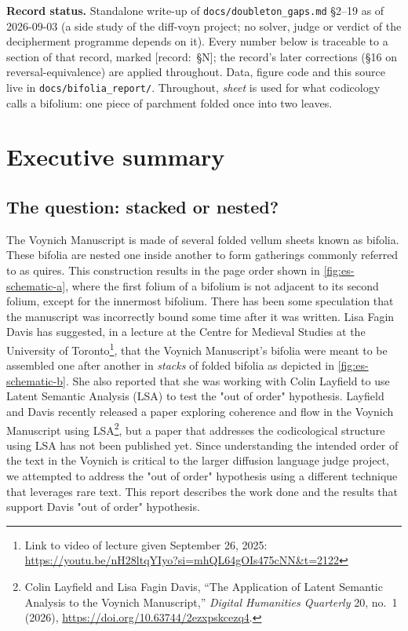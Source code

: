\documentclass[11pt,a4paper]{article}
\newcommand{\src}[1]{{\footnotesize\color{muted}\sffamily\mbox{[record: \S#1]}}}
\begin{document}
\clearpage

\setcounter{tocdepth}{2}
\tableofcontents

\bigskip
\begin{recordnote}
\textbf{Record status.} Standalone write-up of \texttt{docs/doubleton\_gaps.md} \S2--19 as of 2026-09-03 (a side study of the diff-voyn project; no solver, judge or verdict of the decipherment programme depends on it). Every number below is traceable to a section of that record, marked \src{N}; the record's later corrections (\S16 on reversal-equivalence) are applied throughout. Data, figure code and this source live in \texttt{docs/bifolia\_report/}. Throughout, \emph{sheet} is used for what codicology calls a bifolium: one piece of parchment folded once into two leaves.
\end{recordnote}
\clearpage
\section*{Executive summary}
\label{sec:exec}
\setcounter{figure}{0}\setcounter{table}{0}
\renewcommand{\thefigure}{S\arabic{figure}}\renewcommand{\thetable}{S\arabic{table}}


\subsection*{The question: stacked or nested?}

The Voynich Manuscript is made of several folded vellum sheets known as bifolia. These bifolia are nested one inside another to form gatherings commonly referred to as quires. This construction results in the page order shown in \cref{fig:es-schematic-a}, where the first folium of a bifolium is not adjacent to its second folium, except for the innermost bifolium.
There has been some speculation that the manuscript was incorrectly bound some time after it was written. Lisa Fagin Davis has suggested, in a lecture at the Centre for Medieval Studies at the University of Toronto\footnote{Link to video of lecture given September 26, 2025: \url{https://youtu.be/nH28ltqYIyo?si=mhQL64gOIs475cNN&t=2122}}, that the Voynich Manuscript's bifolia were meant to be assembled one after another in \emph{stacks} of folded bifolia as depicted in \cref{fig:es-schematic-b}. She also reported that she was working with Colin Layfield to use Latent Semantic Analysis (LSA) to test the "out of order" hypothesis. Layfield and Davis recently released a paper exploring coherence and flow in the Voynich Manuscript using LSA\footnote{Colin Layfield and Lisa Fagin Davis, ``The Application of Latent Semantic Analysis to the Voynich Manuscript,'' \emph{Digital Humanities Quarterly} 20, no.~1 (2026), \url{https://doi.org/10.63744/2ezxpskcezq4}.}, but a paper that addresses the codicological structure using LSA has not been published yet.
Since understanding the intended order of the text in the Voynich is critical to the larger diffusion language judge project, we attempted to address the "out of order" hypothesis using a different technique that leverages rare text. This report describes the work done and the results that support Davis "out of order" hypothesis. 
\end{document}
